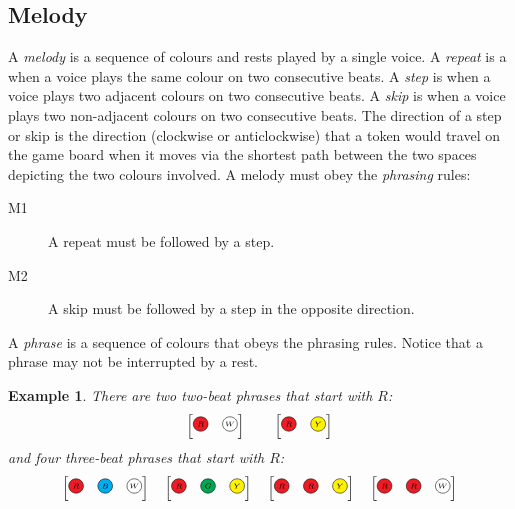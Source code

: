 \documentclass{scrartcl}
\newcommand{\RRR}{
  \begin{tikzpicture}
    \node[circle, draw, fill=Red, inner sep= 0pt, text width=1em, align=center] (n) at (0,0) {$\scriptscriptstyle R$};
  \end{tikzpicture}
}
\newcommand{\WWW}{
  \begin{tikzpicture}
    \node[circle, draw, fill=White,  inner sep= 0pt, text width=1em, align=center] (n) at (0,0) {$\scriptscriptstyle W$};
  \end{tikzpicture}
}
\newcommand{\BBB}{
  \begin{tikzpicture}
    \node[circle, draw, fill=Cyan,  inner sep= 0pt, text width=1em, align=center] (n) at (0,0) {$\scriptscriptstyle B$};
  \end{tikzpicture}
}
\newcommand{\GGG}{
  \begin{tikzpicture}
    \node[circle, draw, fill=Green,  inner sep= 0pt, text width=1em, align=center] (n) at (0,0) {$\scriptscriptstyle G$};
  \end{tikzpicture}
}
\newcommand{\YYY}{
  \begin{tikzpicture}
    \node[circle, draw, fill=Yellow,  inner sep= 0pt, text width=1em, align=center] (n) at (0,0) {$\scriptscriptstyle Y$};
  \end{tikzpicture}
}
\newtheorem{example}{Example}
\numberwithin{example}{section}
\begin{document}
\subsection{Melody}
A \emph{melody} is a sequence of colours and rests played by a single voice.  A \emph{repeat} is a when a voice plays the same colour on two consecutive beats. A \emph{step} is when a voice plays two adjacent colours on two consecutive beats. A \emph{skip} is when a voice plays two non-adjacent colours on two consecutive beats.  The direction of a step or skip
is the direction (clockwise or anticlockwise) that a token would travel on the game board
when it moves via the shortest path between the two spaces depicting the two colours involved. A melody must obey the \emph{phrasing} rules: 
\begin{description}
	\item[M1] A repeat must be followed by a step.
	\item[M2] A skip must be followed by a step in the opposite direction.
\end{description}
A \emph{phrase} is a sequence of colours that obeys the phrasing rules. Notice that a phrase may not be interrupted by a rest.
\begin{example}
There are two two-beat phrases that start with $R$:
\begin{equation}\nonumber
	\begin{bmatrix}\RRR & \WWW\end{bmatrix}
	\qquad
	\begin{bmatrix}\RRR & \YYY\end{bmatrix}
\end{equation}
and four three-beat phrases that start with $R$:
\begin{equation}\nonumber
	\begin{bmatrix}\RRR & \BBB & \WWW\end{bmatrix}
	\quad
	\begin{bmatrix}\RRR & \GGG & \YYY\end{bmatrix}
	\quad
	\begin{bmatrix}\RRR & \RRR & \YYY\end{bmatrix}
	\quad
	\begin{bmatrix}\RRR & \RRR & \WWW\end{bmatrix}
\end{equation}
\end{example}
\end{document}
